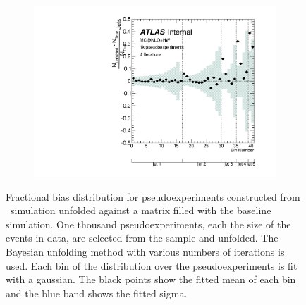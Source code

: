 \begin{figure}
\begin{subfigure}[]{0.5\textwidth}
\end{subfigure}
\begin{subfigure}[]{0.5\textwidth}
\includegraphics[width=\textwidth]{fig/Stress/105200atlfast/FracBias4Iterations.pdf}
\end{subfigure}
\caption{Fractional bias distribution for pseudoexperiments constructed from \mcnlohw\ simulation unfolded against a matrix filled with the baseline simulation. One thousand pseudoexperiments, each the size of the events in data, are selected from the sample and unfolded. The Bayesian unfolding method with various numbers of iterations is used. Each bin of the distribution over the pseudoexperiments is fit with a gaussian. The black points show the fitted mean of each bin and the blue band shows the fitted sigma. }
\label{fig:mcnlohwfrbias}
\end{figure}
\clearpage
